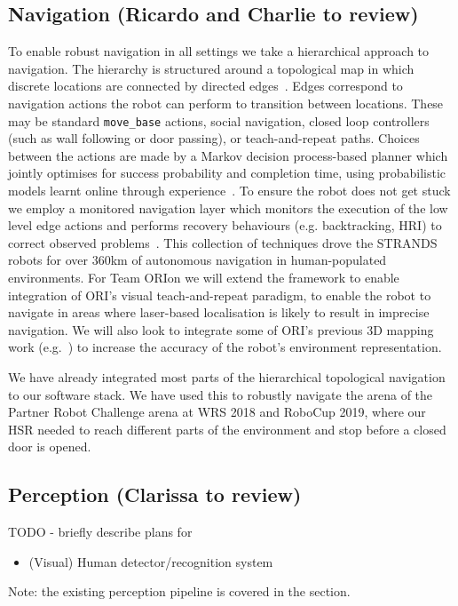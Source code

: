 \documentclass[runningheads,a4paper]{llncs}
\newcommand{\teamori}{Team ORIon}
\begin{document}
\subsection{Navigation (Ricardo and Charlie to review)}

To enable robust navigation in all settings we take a hierarchical approach to navigation. The hierarchy is structured around a topological map in which discrete locations are connected by directed edges~\cite{jpulido2015NowOrLater}. Edges correspond to navigation actions the robot can perform to transition between locations. These may be standard \texttt{move\_base} actions, social navigation, closed loop controllers (such as wall following or door passing), or teach-and-repeat paths. Choices between the actions are made by a Markov decision process-based planner which jointly optimises for success probability and completion time, using probabilistic models learnt online through experience~\cite{lacerda_ijrr19}. To ensure the robot does not get stuck we employ a monitored navigation layer which monitors the execution of the low level edge actions and performs recovery behaviours (e.g. backtracking, HRI) to correct observed problems~\cite{strands@ram}. This collection of techniques drove the STRANDS robots for over 360km of autonomous navigation in human-populated environments. For \teamori{} we will extend the framework to enable integration of ORI's visual teach-and-repeat paradigm, to enable the robot to navigate in areas where laser-based localisation is likely to result in imprecise navigation. We will also look to integrate some of ORI's previous 3D mapping work (e.g.~\cite{AmayoICRA2016}) to increase the accuracy of the robot's environment representation.

We have already integrated most parts of the hierarchical topological navigation
to our software stack. We have used this to robustly navigate the arena of
the Partner Robot Challenge arena at WRS 2018 and RoboCup 2019, where our HSR needed to reach
different parts of the environment and stop before a closed
door is opened.

\subsection{Perception (Clarissa to review)}

TODO - briefly describe plans for
\begin{itemize}
	\item (Visual) Human detector/recognition system
\end{itemize}
Note: the existing perception pipeline is covered in the  section.
\end{document}
